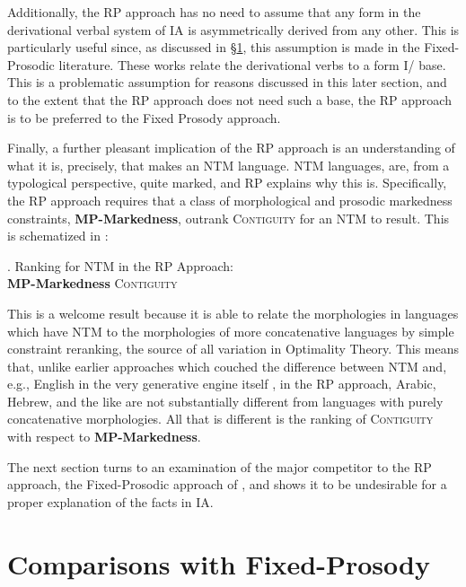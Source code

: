 \documentclass[12pt,twoside,letterpaper]{article}
\begin{document}
Additionally, the RP approach has no need to assume that any form in the derivational verbal system of IA is asymmetrically derived from any other. This is particularly useful since, as discussed in \S{\ref{sec:inad-fixed-pros}}, this assumption is made in the Fixed-Prosodic literature. These works relate the derivational verbs to a form I/{\em {}} base. This is a problematic assumption for reasons discussed in this later section, and to the extent that the RP approach does not need such a base, the RP approach is to be preferred to the Fixed Prosody approach.

Finally, a further pleasant implication of the RP approach is an understanding of what it is, precisely, that makes an NTM language. NTM languages, are, from a typological perspective, quite marked, and RP explains why this is. Specifically, the RP approach requires that a class of morphological and prosodic markedness constraints, \textbf{MP-Markedness}, outrank \textsc{Contiguity} for an NTM to result. This is schematized in \Next:

\ex. Ranking for NTM in the RP Approach:\\\textbf{MP-Markedness} \OTdom  \textsc{Contiguity}

This is a welcome result because it is able to relate the morphologies in languages which have NTM to the morphologies of more concatenative languages by simple constraint reranking, the source of all variation in Optimality Theory. This means that, unlike earlier approaches which couched the difference between NTM and, e.g., English in the very generative engine itself \citep{mccarthy81}, in the RP approach, Arabic, Hebrew, and the like are not substantially different from languages with purely concatenative morphologies. All that is different is the ranking of \textsc{Contiguity} with respect to \textbf{MP-Markedness}.

The next section turns to an examination of the major competitor to the RP approach, the Fixed-Prosodic approach of \cite{ussishkin00,buckley03,ussishkin05}, and shows it to be undesirable for a proper explanation of the facts in IA.


\section{Comparisons with Fixed-Prosody}
\label{sec:inad-fixed-pros}
\end{document}
